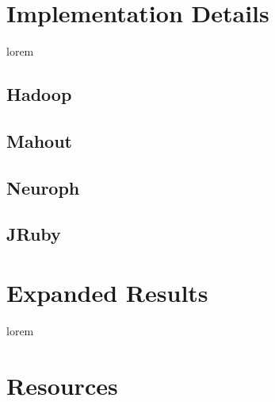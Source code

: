 
\chapter{Implementation Details}

lorem

\section{Hadoop}
\section{Mahout}
\section{Neuroph}
\section{JRuby}

\chapter{Expanded Results}

lorem


\chapter{Resources}
